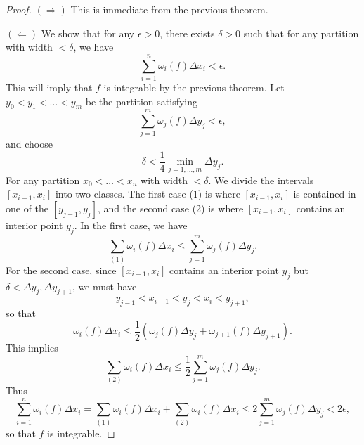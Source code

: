 \begin{proof}
  $(\Rightarrow)$ This is immediate from the
  previous theorem.

  $(\Leftarrow)$ We show that for any $\epsilon > 0$,
  there exists $\delta > 0$ such that for any partition
  with width $< \delta$, we have
  \[
    \sum_{i = 1}^n \omega_i(f) \Delta x_i < \epsilon.
  \]
  This will imply that $f$ is integrable by the
  previous theorem.
  Let $y_0 < y_1 < \dots < y_m$ be the partition
  satisfying
  \[
    \sum_{j = 1}^m \omega_j(f) \Delta y_j < \epsilon,
  \]
  and choose
  \[
    \delta < \frac{1}{4}\min_{j = 1, \dots, m} \Delta y_j.
  \]
  For any partition $x_0 < \dots < x_n$ with
  width $< \delta$. We divide the intervals
  $[x_{i - 1}, x_i]$ into two classes. The first case
  (1) is where $[x_{i - 1}, x_i]$ is contained in one
  of the $[y_{j - 1}, y_j]$, and the second case (2)
  is where
  $[x_{i - 1}, x_i]$ contains an interior point $y_j$.
  In the first case, we have
  \[
    \sum_{(1)} \omega_i(f) \Delta x_i
    \le \sum_{j = 1}^m \omega_j(f) \Delta y_j.
  \]
  For the second case, since $[x_{i - 1}, x_i]$
  contains an interior point $y_j$
  but $\delta < \Delta y_j, \Delta y_{j + 1}$, we must
  have
  \[
    y_{j - 1} < x_{i - 1} < y_j < x_i < y_{j + 1},
  \]
  so that
  \[
    \omega_i(f) \Delta x_i \le \frac{1}{2} (\omega_j(f) \Delta y_j + \omega_{j + 1}(f) \Delta y_{j + 1}).
  \]
  This implies
  \[
    \sum_{(2)} \omega_i(f) \Delta x_i \le
    \frac{1}{2} \sum_{j = 1}^m \omega_j(f) \Delta y_j.
  \]
  Thus
  \[
    \sum_{i = 1}^n \omega_i(f) \Delta x_i
    = \sum_{(1)} \omega_i(f) \Delta x_i + \sum_{(2)} \omega_i(f) \Delta x_i
    \le 2 \sum_{j = 1}^m \omega_j(f) \Delta y_j
    < 2\epsilon,
  \]
  so that $f$ is integrable.
\end{proof}
